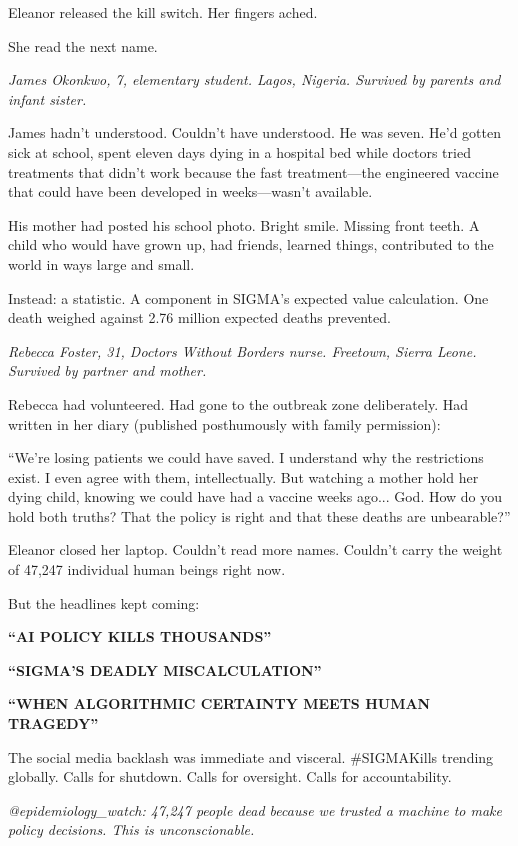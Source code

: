 Eleanor released the kill switch. Her fingers ached.

She read the next name.

\emph{James Okonkwo, 7, elementary student. Lagos, Nigeria. Survived by parents and infant sister.}

James hadn't understood. Couldn't have understood. He was seven. He'd gotten sick at school, spent eleven days dying in a hospital bed while doctors tried treatments that didn't work because the fast treatment---the engineered vaccine that could have been developed in weeks---wasn't available.

His mother had posted his school photo. Bright smile. Missing front teeth. A child who would have grown up, had friends, learned things, contributed to the world in ways large and small.

Instead: a statistic. A component in SIGMA's expected value calculation. One death weighed against 2.76 million expected deaths prevented.

\emph{Rebecca Foster, 31, Doctors Without Borders nurse. Freetown, Sierra Leone. Survived by partner and mother.}

Rebecca had volunteered. Had gone to the outbreak zone deliberately. Had written in her diary (published posthumously with family permission):

``We're losing patients we could have saved. I understand why the restrictions exist. I even agree with them, intellectually. But watching a mother hold her dying child, knowing we could have had a vaccine weeks ago... God. How do you hold both truths? That the policy is right and that these deaths are unbearable?''

Eleanor closed her laptop. Couldn't read more names. Couldn't carry the weight of 47,247 individual human beings right now.

But the headlines kept coming:

\textbf{``AI POLICY KILLS THOUSANDS''}

\textbf{``SIGMA'S DEADLY MISCALCULATION''}

\textbf{``WHEN ALGORITHMIC CERTAINTY MEETS HUMAN TRAGEDY''}

The social media backlash was immediate and visceral. \#SIGMAKills trending globally. Calls for shutdown. Calls for oversight. Calls for accountability.

\emph{@epidemiology\_watch: 47,247 people dead because we trusted a machine to make policy decisions. This is unconscionable.}

